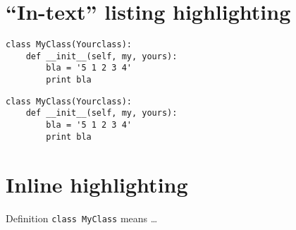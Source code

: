 \documentclass[a4paper,12pt]{article}
\begin{document}
\section{``In-text'' listing highlighting}

\begin{lstlisting}[style=python]
class MyClass(Yourclass):
    def __init__(self, my, yours):
        bla = '5 1 2 3 4'
        print bla
\end{lstlisting}

\begin{verbatim}
class MyClass(Yourclass):
    def __init__(self, my, yours):
        bla = '5 1 2 3 4'
        print bla
\end{verbatim}

\section{Inline highlighting}

Definition \lstinline[style=python]|class MyClass| means \dots
\end{document}
